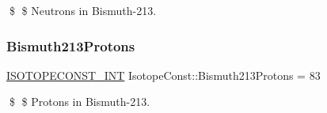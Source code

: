 \$ \$ Neutrons in Bismuth-\/213. \mbox{\label{group___isotope_const-_bismuth-_bi213_ga4d0418ed45a2141c972df5c260f0404b}} 
\subsubsection{\texorpdfstring{Bismuth213\+Protons}{Bismuth213Protons}}
{\footnotesize\ttfamily \mbox{\hyperlink{group___isotope_const-_macros_ga5f18360b3e99483a35c32d789e62621c}{I\+S\+O\+T\+O\+P\+E\+C\+O\+N\+S\+T\+\_\+\+I\+NT}} Isotope\+Const\+::\+Bismuth213\+Protons = 83}

\$ \$ Protons in Bismuth-\/213. 